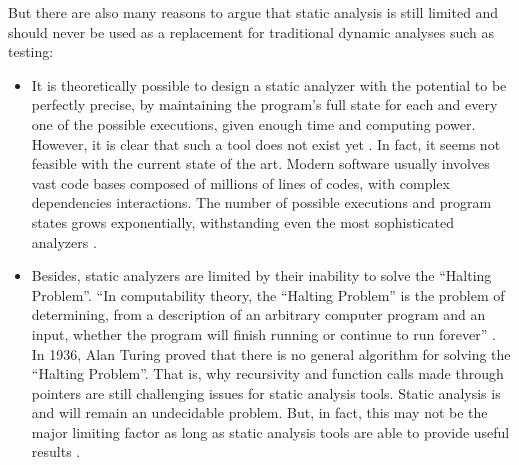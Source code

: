 \vspace{-0.3cm}

But there are also many reasons to argue that static analysis is still limited and should never be used as a replacement for traditional dynamic analyses such as testing:

\vspace{-0.3cm}

\begin{itemize}
    \item[\textcolor{custom-red}{\ding{55}}] It is theoretically possible to design a static analyzer with the potential to be perfectly precise, by maintaining the program's full state for each and every one of the possible executions, given enough time and computing power. However, it is clear that such a tool does not exist yet \cite{anderson2008use}. In fact, it seems not feasible with the current state of the art. Modern software usually involves vast code bases composed of millions of lines of codes, with complex dependencies interactions. The number of possible executions and program states grows exponentially, withstanding even the most sophisticated analyzers \cite{anderson2008use,black2009static}.
    \item[\textcolor{custom-red}{\ding{55}}] Besides, static analyzers are limited by their inability to solve the ``Halting Problem''. ``In computability theory, the ``Halting Problem'' is the problem of determining, from a description of an arbitrary computer program and an input, whether the program will finish running or continue to run forever'' \cite{wikipedia2016halting}. In 1936, Alan Turing proved that there is no general algorithm for solving the ``Halting Problem''. That is, why recursivity and function calls made through pointers are still challenging issues for static analysis tools. Static analysis is and will remain an undecidable problem. But, in fact, this may not be the major limiting factor as long as static analysis tools are able to provide useful results \cite{anderson2008use,black2009static,chess2007secure}.

\end{itemize}
